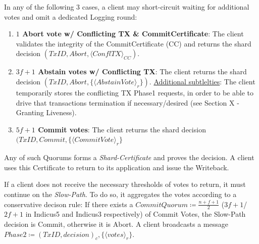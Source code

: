 In any of the following 3 cases, a client may short-circuit waiting for additional votes and omit a dedicated Logging round:
\begin{enumerate}
\item \textbf{$1$ Abort vote w/ Conflicting TX \& CommitCertificate}: The client validates the integrity of the CommitCertificate (CC) and returns the shard decision $(TxID, Abort, \langle ConflTX \rangle_{CC})$.  
\item \textbf{$3f+1$ Abstain votes w/ Conflicting TX}: The client returns the shard decision $(TxID, Abort, \{\langle AbstainVote\rangle_r\})$. 
\underline{Additional subtlelties}: The client temporarily stores the conflicting TX Phase1 requests, in order to be able to drive that transactions termination if necessary/desired (see Section X - Granting Liveness).
\item \textbf{$5f+1$ Commit votes}: The client returns the shard decision $(TxID, Commit, \{\langle CommitVote \rangle_r\}$
\end{enumerate}
Any of such Quorums forms a \textit{Shard-Certificate} and proves the decision. A client uses this Certificate to return to its application and issue the Writeback.

If a client does not receive the necessary thresholds of votes to return, it must continue on the \textit{Slow-Path}. To do so, it aggregates the votes according to a conservative  decison rule:
If there exists a $CommitQuorum \coloneqq \frac{n+f+1}{2}$ ($3f+1$/$2f+1$ in Indicus5 and Indicus3 respectively) of Commit Votes, the Slow-Path decision is Commit, otherwise it is Abort.
A client broadcasts a message $Phase2 \coloneqq (TxID, decision)_c, \{\langle votes \rangle_r\}$.

